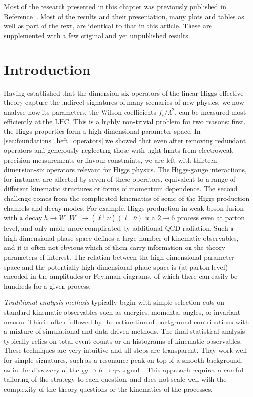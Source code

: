 Most of the research presented in this chapter was previously
published in Reference~\cite{Brehmer:2016nyr}. Most of the results and
their presentation, many plots and tables as well as part of the text,
are identical to that in this article. These are supplemented with a
few original and yet unpublished results.



\section{Introduction}
\label{sec:information_intro}

Having established that the dimension-six operators of the linear
Higgs effective theory capture the indirect signatures of many
scenarios of new physics, we now analyse how its parameters, the
Wilson coefficients $f_i/\Lambda^2$, can be measured most efficiently
at the LHC. This is a highly non-trivial problem for two reasons:
first, the Higgs properties form a high-dimensional parameter
  space. In \autoref{sec:foundations_heft_operators} we showed that
even after removing redundant operators and generously neglecting
those with tight limits from electroweak precision measurements or
flavour constraints, we are left with thirteen dimension-six operators
relevant for Higgs physics. The Higgs-gauge interactions, for
instance, are affected by seven of these operators, equivalent to a
range of different kinematic structures or forms of momentum
dependence. The second challenge comes from the complicated
  kinematics of some of the Higgs production channels and decay
modes. For example, Higgs production in weak boson fusion with a decay
$h \to W^+W^- \to (\ell^+ \nu) (\ell^- \overbar{\nu})$ is a $2 \to 6$
process even at parton level, and only made more complicated by
additional QCD radiation. Such a high-dimensional phase space defines
a large number of kinematic observables, and it is often not obvious
which of them carry information on the theory parameters of
interest. The relation between the high-dimensional parameter space
and the potentially high-dimensional phase space is (at parton level)
encoded in the amplitudes or Feynman diagrams, of which there can
easily be hundreds for a given process.

\emph{Traditional analysis methods} typically begin with simple
selection cuts on standard kinematic observables such as energies,
momenta, angles, or invariant masses. This is often followed by the
estimation of background contributions with a mixture of simulational
and data-driven methods. The final statistical analysis typically
relies on total event counts or on histograms of kinematic
observables.  These techniques are very intuitive and all steps are
transparent. They work well for simple signatures, such as a
resonance peak on top of a smooth background, as in the discovery of
the $gg \to h \to \gamma \gamma$
signal~\cite{Aad:2012tfa,Chatrchyan:2012xdj}. This approach requires a
careful tailoring of the strategy to each question, and does not scale
well with the complexity of the theory questions or the kinematics of
the processes.

